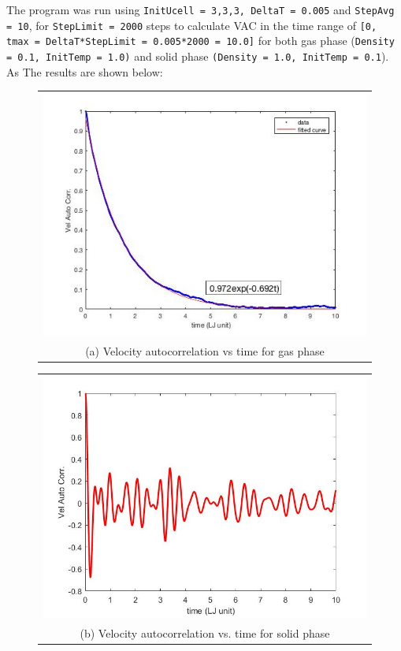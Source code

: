 \documentclass[11pt, oneside]{article}   	%
\begin{document}
The program was run using \texttt{InitUcell = {3,3,3}, DeltaT = 0.005} and \texttt{StepAvg = 10}, for \texttt{StepLimit = 2000} steps to calculate VAC in the time range of \texttt{[0, tmax = DeltaT*StepLimit = 0.005*2000 = 10.0]} for both gas phase (\texttt{Density = 0.1, InitTemp = 1.0)} and solid phase \texttt{(Density = 1.0, InitTemp = 0.1}). As The results are shown below:
	\begin{figure}[!htbp]
	\centering
		\begin{tabular}{@{}c@{}}
		\includegraphics[scale=0.55]{vacGas.jpg} \\[\abovecaptionskip]
		\tiny (a) Velocity autocorrelation vs time for gas phase
		\end{tabular}
		\begin{tabular}{@{}c@{}}
		\includegraphics[scale=0.4]{vacSolid} \\[\abovecaptionskip]
		\tiny (b) Velocity autocorrelation vs. time for solid phase
		\end{tabular}
		
	\end{figure}
	
\end{document}
